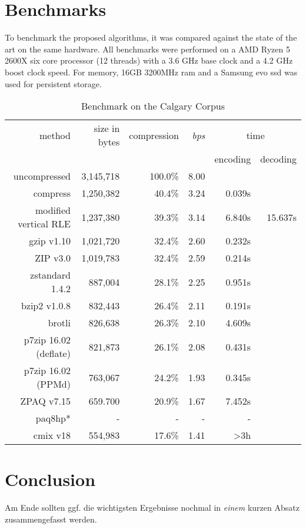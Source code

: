 \section{Benchmarks}
\label{ch:Evaluation:sec:Benchmarks}
\par{
	To benchmark the proposed algorithms, it was compared against the state of the art on the same hardware. All benchmarks were performed on a AMD Ryzen 5 2600X six core processor (12 threads) with a 3.6 GHz base clock and a 4.2 GHz boost clock speed. For memory, 16GB 3200MHz ram and a Samsung evo ssd was used for persistent storage.
}
	\begin{table}[h]
	\begin{tabular}{r|r|r|r|r|r}
		method  &  size in bytes & compression & \textit{bps} & \multicolumn{2}{c}{time }\\
		& & & & encoding & decoding\\
		\hline
		uncompressed & 3,145,718 & 100.0\% & 8.00 &\\
		compress & 1,250,382 & 40.4\% & 3.24 & 0.039s\\
		modified vertical RLE & 1,237,380 & 39.3\%& 3.14 & 6.840s & 15.637s\\
		gzip v1.10 & 1,021,720 & 32.4\% & 2.60 & 0.232s\\
		ZIP v3.0 & 1,019,783 & 32.4\% & 2.59 & 0.214s\\
		zstandard 1.4.2& 887,004 & 28.1\% & 2.25 & 0.951s\\
		bzip2 v1.0.8 & 832,443 & 26.4\% & 2.11 & 0.191s\\
		brotli & 826,638 & 26.3\%& 2.10 & 4.609s\\
		p7zip 16.02 (deflate) &  821,873 & 26.1\% & 2.08 & 0.431s \\
		p7zip 16.02 (PPMd) &  763,067& 24.2\% & 1.93 & 0.345s\\
		ZPAQ v7.15 & 659.700 & 20.9\% & 1.67 & 7.452s \\
		paq8hp* & - & - & - & - \\ 
		cmix v18 & 554,983 & 17.6\% & 1.41 & >3h		
	\end{tabular}
	\label{tab:t100benchmark}
	\caption{Benchmark on the Calgary Corpus}
\end{table}
\section{Conclusion}
\label{ch:Evaluation:sec:Conclusion}

Am Ende sollten ggf. die wichtigsten Ergebnisse nochmal in \emph{einem} kurzen Absatz zusammengefasst werden.

